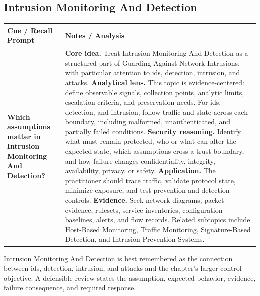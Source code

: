 \documentclass[11pt]{article}
\newcommand{\CornellHeader}{%
\rowcolor{Navy}\color{white}\bfseries Cue / Recall Prompt & \color{white}\bfseries Notes / Analysis\\\hline}
\newcommand{\CornellRow}[2]{%
\cellcolor{CueGray}\RaggedRight\textbf{#1} & \RaggedRight #2\\\hline}
\begin{document}
\subsection*{Intrusion Monitoring And Detection}
\begin{longtable}{>{\RaggedRight\arraybackslash}p{}|>{\RaggedRight\arraybackslash}p{}}
\CornellHeader
\CornellRow{Which assumptions matter in Intrusion Monitoring And Detection?}{\textbf{Core idea.} Treat Intrusion Monitoring And Detection as a structured part of Guarding Against Network Intrusions, with particular attention to ids, detection, intrusion, and attacks. \textbf{Analytical lens.} This topic is evidence-centered: define observable signals, collection points, analytic limits, escalation criteria, and preservation needs. For ids, detection, and intrusion, follow traffic and state across each boundary, including malformed, unauthenticated, and partially failed conditions. \textbf{Security reasoning.} Identify what must remain protected, who or what can alter the expected state, which assumptions cross a trust boundary, and how failure changes confidentiality, integrity, availability, privacy, or safety. \textbf{Application.} The practitioner should trace traffic, validate protocol state, minimize exposure, and test prevention and detection controls. \textbf{Evidence.} Seek network diagrams, packet evidence, rulesets, service inventories, configuration baselines, alerts, and flow records. Related subtopics include Host-Based Monitoring, Traffic Monitoring, Signature-Based Detection, and Intrusion Prevention Systems.}
\end{longtable}
\begin{topicsummary}
Intrusion Monitoring And Detection is best remembered as the connection between ids, detection, intrusion, and attacks and the chapter's larger control objective. A defensible review states the assumption, expected behavior, evidence, failure consequence, and required response.
\end{topicsummary}
\end{document}
